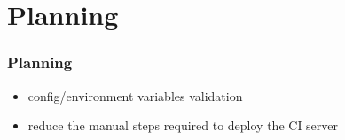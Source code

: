 \documentclass[12pt]{beamer}
\begin{document}
	\section{Planning}
	\begin{frame}
		\frametitle{Planning}
		\begin{itemize}
            \item config/environment variables validation
            \item reduce the manual steps required to deploy the CI server
		\end{itemize}
    \end{frame}
\end{document}
